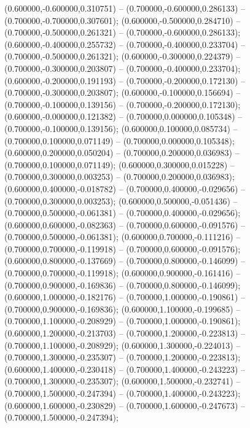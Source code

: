  (0.600000,-0.600000,0.310751) -- (0.700000,-0.600000,0.286133) -- (0.700000,-0.700000,0.307601);
 (0.600000,-0.500000,0.284710) -- (0.700000,-0.500000,0.261321) -- (0.700000,-0.600000,0.286133);
 (0.600000,-0.400000,0.255732) -- (0.700000,-0.400000,0.233704) -- (0.700000,-0.500000,0.261321);
 (0.600000,-0.300000,0.224379) -- (0.700000,-0.300000,0.203807) -- (0.700000,-0.400000,0.233704);
 (0.600000,-0.200000,0.191193) -- (0.700000,-0.200000,0.172130) -- (0.700000,-0.300000,0.203807);
 (0.600000,-0.100000,0.156694) -- (0.700000,-0.100000,0.139156) -- (0.700000,-0.200000,0.172130);
 (0.600000,-0.000000,0.121382) -- (0.700000,0.000000,0.105348) -- (0.700000,-0.100000,0.139156);
 (0.600000,0.100000,0.085734) -- (0.700000,0.100000,0.071149) -- (0.700000,0.000000,0.105348);
 (0.600000,0.200000,0.050204) -- (0.700000,0.200000,0.036983) -- (0.700000,0.100000,0.071149);
 (0.600000,0.300000,0.015228) -- (0.700000,0.300000,0.003253) -- (0.700000,0.200000,0.036983);
 (0.600000,0.400000,-0.018782) -- (0.700000,0.400000,-0.029656) -- (0.700000,0.300000,0.003253);
 (0.600000,0.500000,-0.051436) -- (0.700000,0.500000,-0.061381) -- (0.700000,0.400000,-0.029656);
 (0.600000,0.600000,-0.082363) -- (0.700000,0.600000,-0.091576) -- (0.700000,0.500000,-0.061381);
 (0.600000,0.700000,-0.111216) -- (0.700000,0.700000,-0.119918) -- (0.700000,0.600000,-0.091576);
 (0.600000,0.800000,-0.137669) -- (0.700000,0.800000,-0.146099) -- (0.700000,0.700000,-0.119918);
 (0.600000,0.900000,-0.161416) -- (0.700000,0.900000,-0.169836) -- (0.700000,0.800000,-0.146099);
 (0.600000,1.000000,-0.182176) -- (0.700000,1.000000,-0.190861) -- (0.700000,0.900000,-0.169836);
 (0.600000,1.100000,-0.199685) -- (0.700000,1.100000,-0.208929) -- (0.700000,1.000000,-0.190861);
 (0.600000,1.200000,-0.213703) -- (0.700000,1.200000,-0.223813) -- (0.700000,1.100000,-0.208929);
 (0.600000,1.300000,-0.224013) -- (0.700000,1.300000,-0.235307) -- (0.700000,1.200000,-0.223813);
 (0.600000,1.400000,-0.230418) -- (0.700000,1.400000,-0.243223) -- (0.700000,1.300000,-0.235307);
 (0.600000,1.500000,-0.232741) -- (0.700000,1.500000,-0.247394) -- (0.700000,1.400000,-0.243223);
 (0.600000,1.600000,-0.230829) -- (0.700000,1.600000,-0.247673) -- (0.700000,1.500000,-0.247394);
